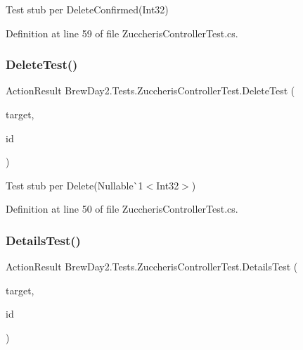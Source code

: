 Test stub per Delete\+Confirmed(\+Int32)



Definition at line 59 of file Zuccheris\+Controller\+Test.\+cs.

\mbox{\label{class_brew_day2_1_1_tests_1_1_zuccheris_controller_test_aecb3a1cf7933523f72b9787e03f28c5b}} 
\subsubsection{\texorpdfstring{Delete\+Test()}{DeleteTest()}}
{\footnotesize\ttfamily Action\+Result Brew\+Day2.\+Tests.\+Zuccheris\+Controller\+Test.\+Delete\+Test (\begin{DoxyParamCaption}\item[{\mbox{[}\+Pex\+Assume\+Under\+Test\mbox{]} \mbox{\hyperlink{class_brew_day2_1_1_controllers_1_1_zuccheris_controller}{Zuccheris\+Controller}}}]{target,  }\item[{int?}]{id }\end{DoxyParamCaption})}



Test stub per Delete(Nullable\`{}1$<$Int32$>$)



Definition at line 50 of file Zuccheris\+Controller\+Test.\+cs.

\mbox{\label{class_brew_day2_1_1_tests_1_1_zuccheris_controller_test_a432b1204fc1d9e7875dab51f40ce4a87}} 
\subsubsection{\texorpdfstring{Details\+Test()}{DetailsTest()}}
{\footnotesize\ttfamily Action\+Result Brew\+Day2.\+Tests.\+Zuccheris\+Controller\+Test.\+Details\+Test (\begin{DoxyParamCaption}\item[{\mbox{[}\+Pex\+Assume\+Under\+Test\mbox{]} \mbox{\hyperlink{class_brew_day2_1_1_controllers_1_1_zuccheris_controller}{Zuccheris\+Controller}}}]{target,  }\item[{int?}]{id }\end{DoxyParamCaption})}



